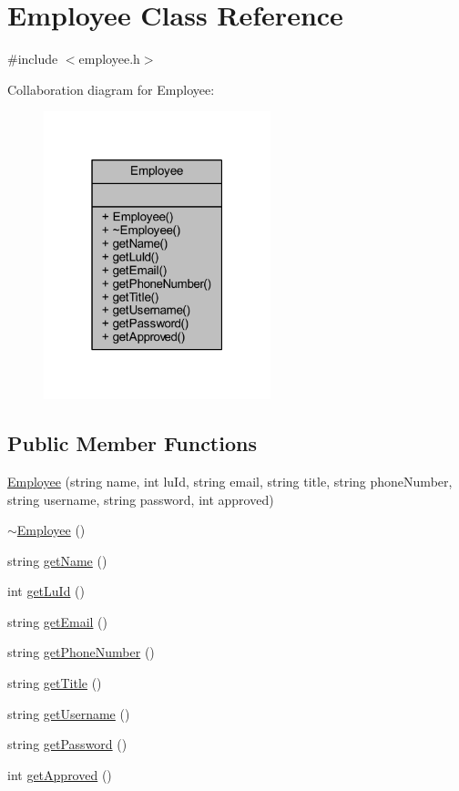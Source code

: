 \hypertarget{class_employee}{}\section{Employee Class Reference}
\label{class_employee}


{\ttfamily \#include $<$employee.\+h$>$}



Collaboration diagram for Employee\+:
\nopagebreak
\begin{figure}[H]
\begin{center}
\leavevmode
\includegraphics[width=187pt]{class_employee__coll__graph}
\end{center}
\end{figure}
\subsection*{Public Member Functions}
\begin{DoxyCompactItemize}
\item 
\hyperlink{class_employee_a55ede26f9c101fd1c81400fe124c7052}{Employee} (string name, int lu\+Id, string email, string title, string phone\+Number, string username, string password, int approved)
\item 
\hyperlink{class_employee_abed56e9c007fff2bfe27ca87251baaf2}{$\sim$\+Employee} ()
\item 
string \hyperlink{class_employee_ab2476ea9935bcc3417c41e48c4f1b297}{get\+Name} ()
\item 
int \hyperlink{class_employee_a0ed36a69ad4b9c187c29bdd1e6f162ec}{get\+Lu\+Id} ()
\item 
string \hyperlink{class_employee_a31c72a588174edcff627ce3ee3bcb6d8}{get\+Email} ()
\item 
string \hyperlink{class_employee_a8a3f91c92402a4b8b59edf13ec40abc9}{get\+Phone\+Number} ()
\item 
string \hyperlink{class_employee_ad40806584fde5a21a4dc775aa1fcc4f0}{get\+Title} ()
\item 
string \hyperlink{class_employee_adbc4cb26306e28f1ce2791aa50f4245e}{get\+Username} ()
\item 
string \hyperlink{class_employee_acc48f9f678410291dc901bc4995d12be}{get\+Password} ()
\item 
int \hyperlink{class_employee_a6536686a3186432263d67ff9ba099e3c}{get\+Approved} ()
\end{DoxyCompactItemize}


